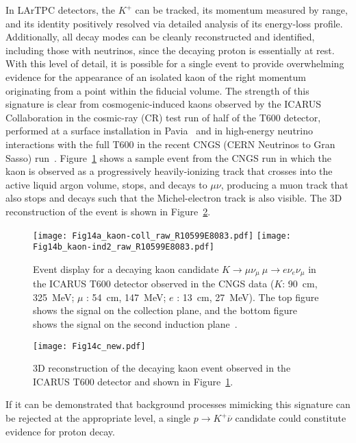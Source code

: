 In LArTPC detectors, the $K^+$ can be tracked, its momentum measured
by range, and its identity positively resolved via detailed analysis
of its energy-loss profile.  Additionally, all decay modes can be
cleanly reconstructed and identified, including those with neutrinos,
since the decaying proton is essentially at rest.  With this level of
detail, it is possible for a single event to provide overwhelming
evidence for the appearance of an isolated kaon of the right momentum
originating from a point within the fiducial volume.  The strength of
this signature is clear from cosmogenic-induced kaons observed by the
ICARUS Collaboration in the cosmic-ray (CR) test run of half of the T600
detector, performed at a surface installation in Pavia~\cite{Amerio:2004ze} 
and in high-energy neutrino interactions with the full T600 in the recent 
CNGS (CERN Neutrinos to Gran Sasso) run~\cite{Antonello:2012hu}.
Figure~\ref{fig:icaruskaon} shows a sample event from the CNGS run in
which the kaon is observed as a progressively heavily-ionizing track 
that crosses into the active liquid argon volume, stops, and
decays to $\mu\nu$, producing a muon track that also stops and decays
such that the Michel-electron track is also visible. The 3D
reconstruction of the event is shown in Figure~\ref{fig:icarusk3d}.
%
\begin{figure}[!htb]
\centering
\texttt{[image: Fig14a\_kaon-coll\_raw\_R10599E8083.pdf]}
\texttt{[image: Fig14b\_kaon-ind2\_raw\_R10599E8083.pdf]}
\caption[Decaying kaon observed during the ICARUS run at CNGS]
{Event display for a decaying kaon candidate $K \rightarrow \mu \nu_\mu \ \mu \rightarrow e \nu_e \nu_\mu$ 
in the ICARUS T600 detector observed
in the CNGS data ($K$: \SI{90}{\cm}, \SI{325}{\MeV}; $\mu$ : \SI{54}{\cm}, \SI{147}{\MeV}; 
$e$ : \SI{13}{\cm}, \SI{27}{\MeV}). The top figure shows the signal on the collection plane,
  and the bottom figure shows the signal on the second induction plane~\cite{Antonello:2012hu}.}
\label{fig:icaruskaon}
\end{figure}
\begin{figure}[!htb]
\texttt{[image: Fig14c\_new.pdf]}
\caption[3D construction of decaying kaon in the ICARUS detector]{3D reconstruction of the decaying kaon event observed in the ICARUS T600 detector and shown in Figure~\ref{fig:icaruskaon}.}
\label{fig:icarusk3d}
\end{figure}

If it can be demonstrated that background processes mimicking this
signature can be rejected at the appropriate level, 
a single $p\to K^+\overline{\nu}$ candidate could constitute 
evidence for proton decay. %


